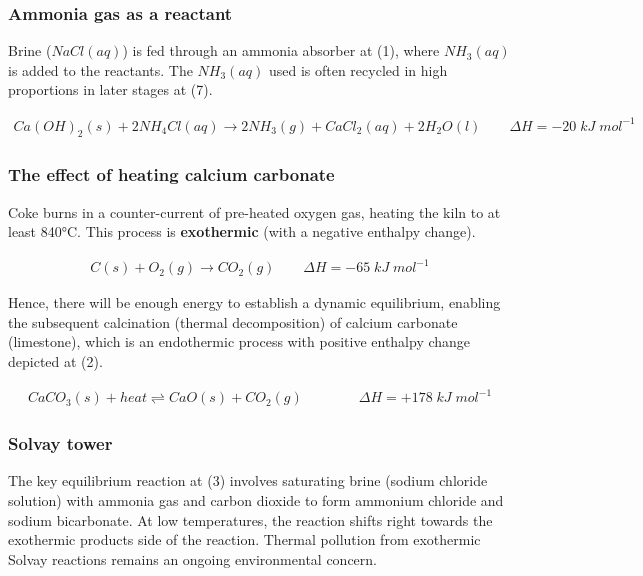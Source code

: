 \documentclass[12pt, a4paper]{article}
\begin{document}
\subsubsection{Ammonia gas as a reactant}

Brine (\(NaCl(aq)\)) is fed through an ammonia absorber at (1), where \(NH_{3}(aq)\) is added to the reactants. The \(NH_{3}(aq)\) used is often recycled in high proportions in later stages at (7).

\begin{align}
	Ca(OH)_{2}(s) + 2NH_{4}Cl(aq) \rightarrow 2NH_{3}(g) + CaCl_{2}(aq) + 2H_{2}O(l) \qquad \Delta H = -20 \; kJ \; mol^{-1}
\end{align}


\subsubsection{The effect of heating calcium carbonate}

Coke burns in a counter-current of pre-heated oxygen gas, heating the kiln to at least 840°C. This process is \textbf{exothermic} (with a negative enthalpy change).

\begin{align}
	C(s) + O_{2}(g) \rightarrow CO_{2}(g) \qquad \Delta H = -65 \; kJ \; mol^{-1}
\end{align}

Hence, there will be enough energy to establish a dynamic equilibrium, enabling the subsequent calcination (thermal decomposition) of calcium carbonate (limestone), which is an endothermic process with positive enthalpy change depicted at (2).

\begin{align}
	CaCO_{3}(s) + heat \rightleftharpoons CaO(s) + CO_{2}(g) \qquad \qquad \Delta H = +178 \; kJ \; mol^{-1}
\end{align}

\subsubsection{Solvay tower}

The key equilibrium reaction at (3) involves saturating brine (sodium chloride solution) with ammonia gas and carbon dioxide to form ammonium chloride and sodium bicarbonate. At low temperatures, the reaction shifts right towards the exothermic products side of the reaction. Thermal pollution from exothermic Solvay reactions remains an ongoing environmental concern.
\end{document}
